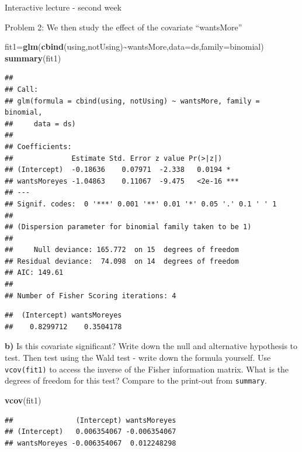 \documentclass[
  ignorenonframetext,
]{beamer}
\newenvironment{Shaded}{\begin{snugshade}}{\end{snugshade}}
\newcommand{\AttributeTok}[1]{\textcolor[rgb]{0.13,0.29,0.53}{#1}}
\newcommand{\FunctionTok}[1]{\textcolor[rgb]{0.13,0.29,0.53}{\textbf{#1}}}
\newcommand{\NormalTok}[1]{#1}
\newcommand{\OtherTok}[1]{\textcolor[rgb]{0.56,0.35,0.01}{#1}}
\newcommand{\SpecialCharTok}[1]{\textcolor[rgb]{0.81,0.36,0.00}{\textbf{#1}}}
\begin{document}
\begin{frame}[fragile]{Interactive lecture - second week}
\begin{block}{Problem 2: We then study the effect of the covariate
``wantsMore''}
\begin{Shaded}
\begin{Highlighting}[]
\NormalTok{fit1}\OtherTok{=}\FunctionTok{glm}\NormalTok{(}\FunctionTok{cbind}\NormalTok{(using,notUsing)}\SpecialCharTok{\textasciitilde{}}\NormalTok{wantsMore,}\AttributeTok{data=}\NormalTok{ds,}\AttributeTok{family=}\NormalTok{binomial)}
\FunctionTok{summary}\NormalTok{(fit1)}
\end{Highlighting}
\end{Shaded}

\begin{verbatim}
## 
## Call:
## glm(formula = cbind(using, notUsing) ~ wantsMore, family = binomial, 
##     data = ds)
## 
## Coefficients:
##              Estimate Std. Error z value Pr(>|z|)    
## (Intercept)  -0.18636    0.07971  -2.338   0.0194 *  
## wantsMoreyes -1.04863    0.11067  -9.475   <2e-16 ***
## ---
## Signif. codes:  0 '***' 0.001 '**' 0.01 '*' 0.05 '.' 0.1 ' ' 1
## 
## (Dispersion parameter for binomial family taken to be 1)
## 
##     Null deviance: 165.772  on 15  degrees of freedom
## Residual deviance:  74.098  on 14  degrees of freedom
## AIC: 149.61
## 
## Number of Fisher Scoring iterations: 4
\end{verbatim}

\begin{Shaded}
\end{Shaded}

\begin{verbatim}
##  (Intercept) wantsMoreyes 
##    0.8299712    0.3504178
\end{verbatim}

\textbf{b)} Is this covariate significant? Write down the null and
alternative hypothesis to test. Then test using the Wald test - write
down the formula yourself. Use \texttt{vcov(fit1)} to access the inverse
of the Fisher information matrix. What is the degrees of freedom for
this test? Compare to the print-out from \texttt{summary}.

\begin{Shaded}
\begin{Highlighting}[]
\FunctionTok{vcov}\NormalTok{(fit1)}
\end{Highlighting}
\end{Shaded}

\begin{verbatim}
##               (Intercept) wantsMoreyes
## (Intercept)   0.006354067 -0.006354067
## wantsMoreyes -0.006354067  0.012248298
\end{verbatim}


\end{block}
\end{frame}
\end{document}

